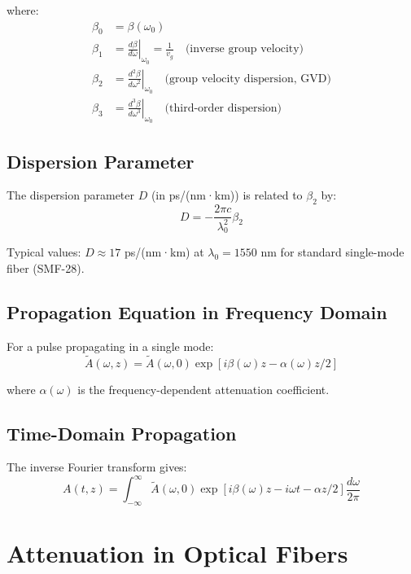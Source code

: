 \documentclass[12pt,a4paper]{article}
\begin{document}
where:
\begin{align}
\beta_0 &= \beta(\omega_0) \\
\beta_1 &= \left.\frac{d\beta}{d\omega}\right|_{\omega_0} = \frac{1}{v_g} \quad \text{(inverse group velocity)} \label{eq:beta1}\\
\beta_2 &= \left.\frac{d^2\beta}{d\omega^2}\right|_{\omega_0} \quad \text{(group velocity dispersion, GVD)} \label{eq:beta2}\\
\beta_3 &= \left.\frac{d^3\beta}{d\omega^3}\right|_{\omega_0} \quad \text{(third-order dispersion)} \label{eq:beta3}
\end{align}

\subsection{Dispersion Parameter}

The dispersion parameter $D$ (in ps/(nm·km)) is related to $\beta_2$ by:
\begin{equation}
D = -\frac{2\pi c}{\lambda_0^2} \beta_2
\end{equation}

Typical values: $D \approx 17$ ps/(nm·km) at $\lambda_0 = 1550$ nm for standard single-mode fiber (SMF-28).

\subsection{Propagation Equation in Frequency Domain}

For a pulse propagating in a single mode:
\begin{equation}
\tilde{A}(\omega, z) = \tilde{A}(\omega, 0) \exp[i\beta(\omega)z - \alpha(\omega)z/2] \label{eq:freq_propagation}
\end{equation}

where $\alpha(\omega)$ is the frequency-dependent attenuation coefficient.

\subsection{Time-Domain Propagation}

The inverse Fourier transform gives:
\begin{equation}
A(t, z) = \int_{-\infty}^{\infty} \tilde{A}(\omega, 0) \exp[i\beta(\omega)z - i\omega t - \alpha z/2] \frac{d\omega}{2\pi} \label{eq:time_propagation}
\end{equation}

\section{Attenuation in Optical Fibers}
\end{document}
